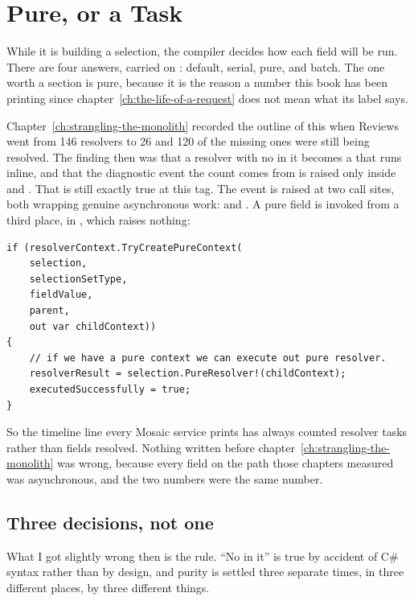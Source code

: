 \section{Pure, or a Task}
\label{sec:ch16-pure-or-a-task}
%

While it is building a selection, the compiler decides how each field will be
run. There are four answers, carried on : default,
serial, pure, and batch. The one worth a section is pure, because it is the
reason a number this book has been printing since
chapter~\ref{ch:the-life-of-a-request} does not mean what its label says.

%
Chapter~\ref{ch:strangling-the-monolith} recorded the outline of this when
Reviews went from 146 resolvers to 26 and 120 of the missing ones were still
being resolved. The finding then was that a resolver with no  in it
becomes a  that runs inline, and that the diagnostic
event the count comes from is raised only inside  and
. That is still exactly true at this tag. The event is
raised at two call sites, both wrapping genuine asynchronous work:
 and
. A pure field is invoked from a third place, in
, which raises nothing:

\begin{verbatim}
if (resolverContext.TryCreatePureContext(
    selection,
    selectionSetType,
    fieldValue,
    parent,
    out var childContext))
{
    // if we have a pure context we can execute out pure resolver.
    resolverResult = selection.PureResolver!(childContext);
    executedSuccessfully = true;
}
\end{verbatim}

So the timeline line every Mosaic service prints has always counted resolver
tasks rather than fields resolved. Nothing written before
chapter~\ref{ch:strangling-the-monolith} was wrong, because every field on the
path those chapters measured was asynchronous, and the two numbers were the same
number.

\subsection*{Three decisions, not one}

What I got slightly wrong then is the rule. \enquote{No  in it} is
true by accident of C\# syntax rather than by design, and purity is settled
three separate times, in three different places, by three different things.

